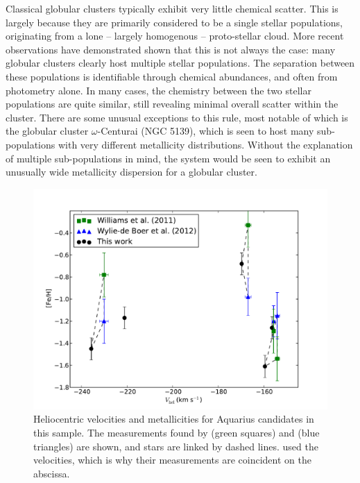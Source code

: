 \documentclass{emulateapj}
\begin{document}
Classical globular clusters typically exhibit very little chemical scatter. This is largely because they are primarily considered to be a single stellar populations, originating from a lone \--- largely homogenous \--- proto-stellar cloud. More recent observations have demonstrated shown that this is not always the case: many globular clusters clearly host multiple stellar populations. The separation between these populations is identifiable through chemical abundances, and often from photometry alone. In many cases, the chemistry between the two stellar populations are quite similar, still revealing minimal overall scatter within the cluster. There are some unusual exceptions to this rule, most notable of which is the globular cluster $\omega$-Centurai (NGC 5139), which is seen to host many sub-populations with very different metallicity distributions. Without the explanation of multiple sub-populations in mind, the system would be seen to exhibit an unusually wide metallicity dispersion for a globular cluster.

\begin{figure}[t!]
	\includegraphics[width=\textwidth]{./figures/aquarius-vhel-feh.pdf}
	\caption{Heliocentric velocities and metallicities for Aquarius candidates in this sample. The measurements found by \citet{williams;et-al_2011} (green squares) and \citet{wylie-de-boer;et-al_2012} (blue triangles) are shown, and stars are linked by dashed lines. \citet{wylie-de-boer;et-al_2012} used the \citet{williams;et-al_2011} velocities, which is why their measurements are coincident on the abscissa.}
	\label{fig:aquarius-vhel-feh}
\end{figure}
\end{document}
